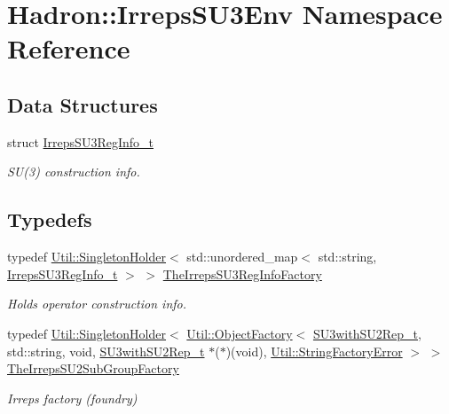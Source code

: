 \hypertarget{namespaceHadron_1_1IrrepsSU3Env}{}\section{Hadron\+:\+:Irreps\+S\+U3\+Env Namespace Reference}
\label{namespaceHadron_1_1IrrepsSU3Env}
\subsection*{Data Structures}
\begin{DoxyCompactItemize}
\item 
struct \mbox{\hyperlink{structHadron_1_1IrrepsSU3Env_1_1IrrepsSU3RegInfo__t}{Irreps\+S\+U3\+Reg\+Info\+\_\+t}}
\begin{DoxyCompactList}\small\item\em S\+U(3) construction info. \end{DoxyCompactList}\end{DoxyCompactItemize}
\subsection*{Typedefs}
\begin{DoxyCompactItemize}
\item 
typedef \mbox{\hyperlink{classUtil_1_1SingletonHolder}{Util\+::\+Singleton\+Holder}}$<$ std\+::unordered\+\_\+map$<$ std\+::string, \mbox{\hyperlink{structHadron_1_1IrrepsSU3Env_1_1IrrepsSU3RegInfo__t}{Irreps\+S\+U3\+Reg\+Info\+\_\+t}} $>$ $>$ \mbox{\hyperlink{namespaceHadron_1_1IrrepsSU3Env_afae3999d49fb44dd4174d52c7857e0a0}{The\+Irreps\+S\+U3\+Reg\+Info\+Factory}}
\begin{DoxyCompactList}\small\item\em Holds operator construction info. \end{DoxyCompactList}\item 
typedef \mbox{\hyperlink{classUtil_1_1SingletonHolder}{Util\+::\+Singleton\+Holder}}$<$ \mbox{\hyperlink{classUtil_1_1ObjectFactory}{Util\+::\+Object\+Factory}}$<$ \mbox{\hyperlink{structHadron_1_1SU3withSU2Rep__t}{S\+U3with\+S\+U2\+Rep\+\_\+t}}, std\+::string, void, \mbox{\hyperlink{structHadron_1_1SU3withSU2Rep__t}{S\+U3with\+S\+U2\+Rep\+\_\+t}} $\ast$($\ast$)(void), \mbox{\hyperlink{structUtil_1_1StringFactoryError}{Util\+::\+String\+Factory\+Error}} $>$ $>$ \mbox{\hyperlink{namespaceHadron_1_1IrrepsSU3Env_a9181cfdbbaf06ae969f8608df49cdd7b}{The\+Irreps\+S\+U2\+Sub\+Group\+Factory}}
\begin{DoxyCompactList}\small\item\em Irreps factory (foundry) \end{DoxyCompactList}\end{DoxyCompactItemize}
